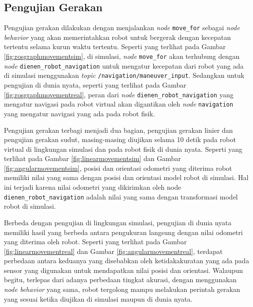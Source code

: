 \subsection{Pengujian Gerakan}
\label{subsec:movementtesting}




Pengujian gerakan dilakukan dengan menjalankan \emph{node} \lstinline{move_for} sebagai \emph{node behavior} yang akan memerintahkan robot untuk bergerak dengan kecepatan tertentu selama kurun waktu tertentu.
Seperti yang terlihat pada Gambar \ref{fig:rosgraphmovementsim},
  di simulasi,
  \emph{node} \lstinline{move_for} akan terhubung dengan \emph{node} \lstinline{dienen_robot_navigation} untuk mengatur kecepatan dari robot yang ada di simulasi menggunakan \emph{topic} \lstinline{/navigation/maneuver_input}.
Sedangkan untuk pengujian di dunia nyata, seperti yang terlihat pada Gambar \ref{fig:rosgraphmovementreal},
  peran dari \emph{node} \lstinline{dienen_robot_navigation} yang mengatur navigasi pada robot virtual akan digantikan oleh \emph{node} \lstinline{navigation} yang mengatur navigasi yang ada pada robot fisik.




Pengujian gerakan terbagi menjadi dua bagian,
  pengujian gerakan linier dan pengujian gerakan sudut,
  masing-masing diujikan selama 10 detik pada robot virtual di lingkungan simulasi dan pada robot fisik di dunia nyata.
Seperti yang terlihat pada Gambar \ref{fig:linearmovementsim} dan Gambar \ref{fig:angularmovementsim},
  posisi dan orientasi odometri yang diterima robot memiliki nilai yang sama dengan posisi dan orientasi model robot di simulasi.
Hal ini terjadi karena nilai odometri yang dikirimkan oleh node \lstinline{dienen_robot_navigation} adalah nilai yang sama dengan transformasi model robot di simulasi.




Berbeda dengan pengujian di lingkungan simulasi,
  pengujian di dunia nyata memiliki hasil yang berbeda antara pengukuran langsung dengan nilai odometri yang diterima oleh robot.
Seperti yang terlihat pada Gambar \ref{fig:linearmovementreal} dan Gambar \ref{fig:angularmovementreal},
  terdapat perbedaan antara keduanya yang disebabkan oleh ketidakakuratan yang ada pada sensor yang digunakan untuk mendapatkan nilai posisi dan orientasi.
Walaupun begitu,
  terlepas dari adanya perbedaan tingkat akurasi, dengan menggunakan \emph{node behavior} yang sama,
  robot tergolong mampu melakukan perintah gerakan yang sesuai ketika diujikan di simulasi maupun di dunia nyata.
